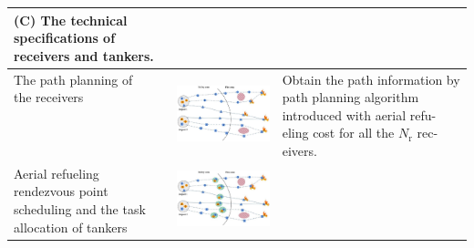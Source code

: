 \begin{table}
\begin{centering}
\begin{tabular}{p{2.4cm}|p{9.3cm}|p{3.4cm}}
			(C) The technical specifications of receivers and tankers.\tabularnewline
			\hline
			\tabincell{l}{The path planning of\\ the receivers\\\\\\\\}&\begin{adjustbox}{raise=-0.3\height}\includegraphics{Figures/Figs_Ch16/p2.pdf}\end{adjustbox}
			&
			\tabincell{l}{Obtain the path information \\by path planning algorithm \\introduced with aerial refu-\\eling cost for all the $N_{\text{r}}$ rec-\\eivers.\\\\\\}\tabularnewline
			\hline
			Aerial refueling rendezvous point scheduling and the task allocation of tankers&\begin{adjustbox}{raise=-0.7\height}\includegraphics{Figures/Figs_Ch16/p3.pdf}\end{adjustbox}

\end{tabular}
\end{centering}
\end{table}
